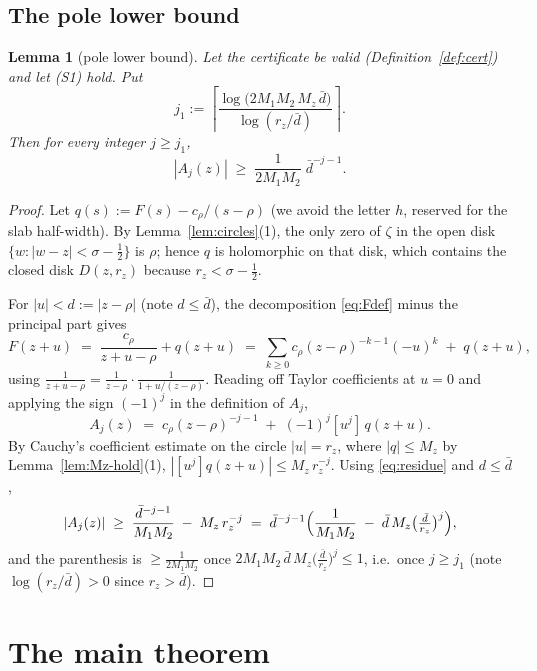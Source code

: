 \documentclass[11pt]{amsart}
\newtheorem{lemma}[theorem]{Lemma}
\numberwithin{equation}{section}
\newcommand{\Sig}{\sigma}
\newcommand{\dbar}{\bar{d}}
\begin{document}
\subsection{The pole lower bound}

\begin{lemma}[pole lower bound]\label{lem:pole-lower}
Let the certificate be valid (Definition~\ref{def:cert}) and let (S1)
hold. Put
\[
j_1 := \left\lceil
\frac{\log\bigl(2 M_1 M_2\, M_z\, \dbar\bigr)}
{\log(r_z/\dbar)} \right\rceil .
\]
Then for every integer $j \ge j_1$,
\[
|A_j(z)| \;\ge\; \frac{1}{2 M_1 M_2}\;\dbar^{-j-1}.
\]
\end{lemma}

\begin{proof}
Let $q(s) := F(s) - c_\rho/(s-\rho)$ (we avoid the letter $h$, reserved
for the slab half-width). By Lemma~\ref{lem:circles}(1), the only zero
of $\zeta$ in the open disk $\{w : |w - z| < \Sig - \tfrac12\}$ is
$\rho$; hence $q$ is holomorphic on that disk, which contains the
closed disk $D(z, r_z)$ because $r_z < \Sig - \tfrac12$.

For $|u| < d := |z - \rho|$ (note $d \le \dbar$), the decomposition
\eqref{eq:Fdef} minus the principal part gives
\[
F(z+u) \;=\; \frac{c_\rho}{z+u-\rho} + q(z+u)
\;=\; \sum_{k \ge 0} c_\rho (z-\rho)^{-k-1} (-u)^k \;+\; q(z+u),
\]
using $\frac{1}{z+u-\rho} = \frac{1}{z-\rho}\cdot
\frac{1}{1 + u/(z-\rho)}$. Reading off Taylor coefficients at $u = 0$
and applying the sign $(-1)^j$ in the definition of $A_j$,
\[
A_j(z) \;=\; c_\rho (z-\rho)^{-j-1} \;+\; (-1)^j [u^j]\,q(z+u).
\]
By Cauchy's coefficient estimate on the circle $|u| = r_z$, where
$|q| \le M_z$ by Lemma~\ref{lem:Mz-hold}(1),
$|[u^j]q(z+u)| \le M_z\, r_z^{-j}$. Using
\eqref{eq:residue} and $d \le \dbar$,
\[
|A_j(z)| \;\ge\; \frac{\dbar^{-j-1}}{M_1 M_2} \;-\; M_z\, r_z^{-j}
\;=\; \dbar^{-j-1}\Bigl(\frac{1}{M_1M_2} \;-\; \dbar\, M_z
\bigl(\tfrac{\dbar}{r_z}\bigr)^{j}\Bigr),
\]
and the parenthesis is $\ge \frac{1}{2M_1M_2}$ once
$2 M_1 M_2\, \dbar\, M_z \bigl(\frac{\dbar}{r_z}\bigr)^{j} \le 1$,
i.e.\ once $j \ge j_1$ (note $\log(r_z/\dbar) > 0$ since $r_z > \dbar$).
\end{proof}

\section{The main theorem}\label{sec:main}
\end{document}
